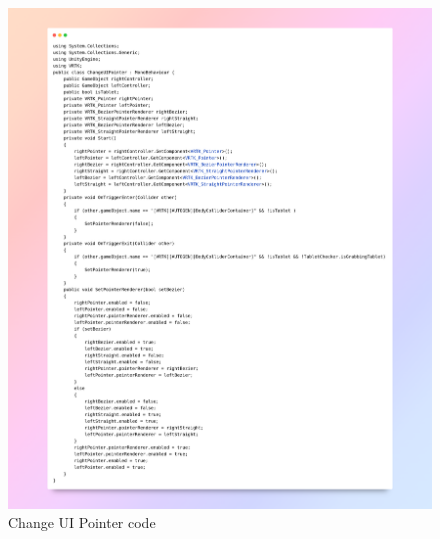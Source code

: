 \begin{figure}[ht]
	\centering
	\includegraphics[width=1\linewidth, height=1.6\linewidth]{Images/ChangeUIPointer.png}
	\caption{Change UI Pointer code}
\end{figure}


